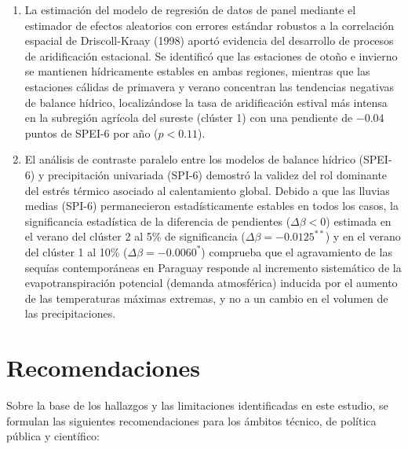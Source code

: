 \begin{enumerate}
    \item La estimación del modelo de regresión de datos de panel mediante el estimador de efectos aleatorios con errores estándar robustos a la correlación espacial de Driscoll-Kraay (1998) aportó evidencia del desarrollo de procesos de aridificación estacional. Se identificó que las estaciones de otoño e invierno se mantienen hídricamente estables en ambas regiones, mientras que las estaciones cálidas de primavera y verano concentran las tendencias negativas de balance hídrico, localizándose la tasa de aridificación estival más intensa en la subregión agrícola del sureste (clúster 1) con una pendiente de $-0.04$ puntos de SPEI-6 por año ($p < 0.11$).
    
    \item El análisis de contraste paralelo entre los modelos de balance hídrico (SPEI-6) y precipitación univariada (SPI-6) demostró la validez del rol dominante del estrés térmico asociado al calentamiento global. Debido a que las lluvias medias (SPI-6) permanecieron estadísticamente estables en todos los casos, la significancia estadística de la diferencia de pendientes ($\Delta \beta < 0$) estimada en el verano del clúster 2 al 5\% de significancia ($\Delta \beta = -0.0125^{**}$) y en el verano del clúster 1 al 10\% ($\Delta \beta = -0.0060^{*}$) comprueba que el agravamiento de las sequías contemporáneas en Paraguay responde al incremento sistemático de la evapotranspiración potencial (demanda atmosférica) inducida por el aumento de las temperaturas máximas extremas, y no a un cambio en el volumen de las precipitaciones.
\end{enumerate}

\section{Recomendaciones}

Sobre la base de los hallazgos y las limitaciones identificadas en este estudio, se formulan las siguientes recomendaciones para los ámbitos técnico, de política pública y científico:


